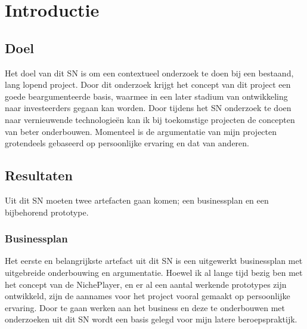 \section{Introductie}

\subsection{Doel}
Het doel van dit SN is om een contextueel onderzoek te doen bij een bestaand, lang lopend project. Door dit onderzoek krijgt het concept van dit project een goede beargumenteerde basis, waarmee in een later stadium van ontwikkeling naar investeerders gegaan kan worden. Door tijdens het SN onderzoek te doen naar vernieuwende technologieën kan ik bij toekomstige projecten de concepten van beter onderbouwen. Momenteel is de argumentatie van mijn projecten grotendeels gebaseerd op persoonlijke ervaring en dat van anderen.

\subsection{Resultaten}
Uit dit SN moeten twee artefacten gaan komen; een businessplan en een bijbehorend prototype.

\subsubsection*{Businessplan}
Het eerste en belangrijkste artefact uit dit SN is een uitgewerkt businessplan met uitgebreide onderbouwing en argumentatie. Hoewel ik al lange tijd bezig ben met het concept van de NichePlayer, en er al een aantal werkende prototypes zijn ontwikkeld, zijn de aannames voor het project vooral gemaakt op persoonlijke ervaring. Door te gaan werken aan het business en deze te onderbouwen met onderzoeken uit dit SN wordt een basis gelegd voor mijn latere beroepspraktijk.

